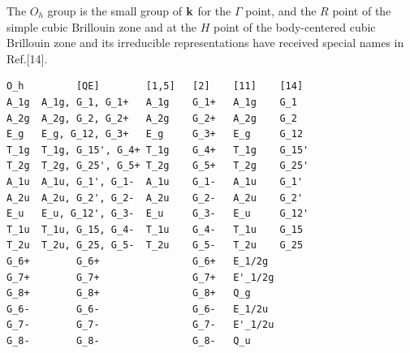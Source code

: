 \documentclass[12pt,a4paper]{article}
\begin{document}
The $O_h$ group is the small group of ${\bf k}$ for the $\Gamma$ point, 
and the $R$ point of the simple cubic Brillouin zone and at
the $H$ point of the body-centered cubic Brillouin zone and its irreducible
representations have received special names in Ref.[14].
\begin{verbatim}
O_h         [QE]        [1,5]   [2]    [11]    [14]
A_1g  A_1g, G_1, G_1+   A_1g    G_1+   A_1g    G_1
A_2g  A_2g, G_2, G_2+   A_2g    G_2+   A_2g    G_2
E_g   E_g, G_12, G_3+   E_g     G_3+   E_g     G_12
T_1g  T_1g, G_15', G_4+ T_1g    G_4+   T_1g    G_15'
T_2g  T_2g, G_25', G_5+ T_2g    G_5+   T_2g    G_25'
A_1u  A_1u, G_1', G_1-  A_1u    G_1-   A_1u    G_1'
A_2u  A_2u, G_2', G_2-  A_2u    G_2-   A_2u    G_2'
E_u   E_u, G_12', G_3-  E_u     G_3-   E_u     G_12'
T_1u  T_1u, G_15, G_4-  T_1u    G_4-   T_1u    G_15
T_2u  T_2u, G_25, G_5-  T_2u    G_5-   T_2u    G_25
G_6+        G_6+                G_6+   E_1/2g
G_7+        G_7+                G_7+   E'_1/2g
G_8+        G_8+                G_8+   Q_g
G_6-        G_6-                G_6-   E_1/2u
G_7-        G_7-                G_7-   E'_1/2u
G_8-        G_8-                G_8-   Q_u
\end{verbatim} 


\newpage
\end{document}
